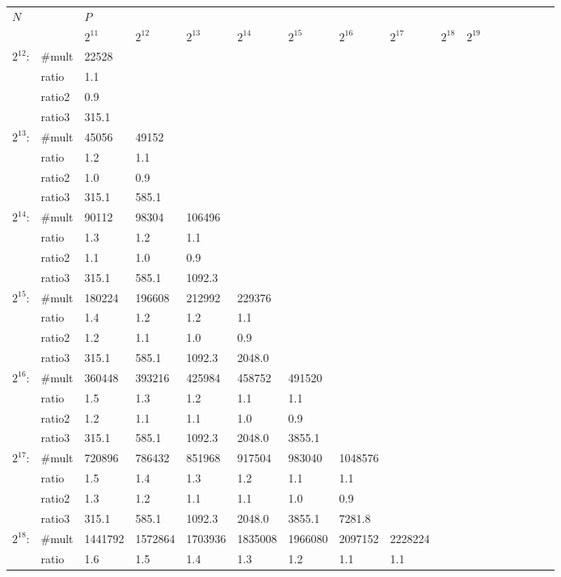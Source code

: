 \documentclass[10pt]{article}
\begin{document}
\begin{table*}
\vspace*{1em}
{\tiny
\begin{tabular}{lllllllllllllllll}
\hline
$N$ & & $P$ \\
     &   &     $2^{11}$ & $2^{12}$  & $2^{13}$ & $2^{14}$ & $2^{15}$ & $2^{16}$ & $2^{17}$ & $2^{18}$ & $2^{19}$  \\
  \hline 
  $2^{12}$: & \#mult &  22528\\
          & ratio & 1.1\\
          & ratio2 & 0.9\\
          & ratio3 & 315.1\\[.3em]
$2^{13}$: & \#mult &  45056&  49152\\
          & ratio & 1.2& 1.1\\
          & ratio2 & 1.0& 0.9\\
          & ratio3 & 315.1& 585.1\\[.3em]
$2^{14}$: & \#mult &  90112&  98304&  106496\\
          & ratio & 1.3& 1.2& 1.1\\
          & ratio2 & 1.1& 1.0& 0.9\\
          & ratio3 & 315.1& 585.1& 1092.3\\[.3em]
$2^{15}$: & \#mult &  180224&  196608&  212992&  229376\\
          & ratio & 1.4& 1.2& 1.2& 1.1\\
          & ratio2 & 1.2& 1.1& 1.0& 0.9\\
          & ratio3 & 315.1& 585.1& 1092.3& 2048.0\\[.3em]
$2^{16}$: & \#mult &  360448&  393216&  425984&  458752&  491520\\
          & ratio & 1.5& 1.3& 1.2& 1.1& 1.1\\
          & ratio2 & 1.2& 1.1& 1.1& 1.0& 0.9\\
          & ratio3 & 315.1& 585.1& 1092.3& 2048.0& 3855.1\\[.3em]
$2^{17}$: & \#mult &  720896&  786432&  851968&  917504&  983040&  1048576\\
          & ratio & 1.5& 1.4& 1.3& 1.2& 1.1& 1.1\\
          & ratio2 & 1.3& 1.2& 1.1& 1.1& 1.0& 0.9\\
          & ratio3 & 315.1& 585.1& 1092.3& 2048.0& 3855.1& 7281.8\\[.3em]
$2^{18}$: & \#mult &  1441792&  1572864&  1703936&  1835008&  1966080&  2097152&  2228224\\
          & ratio & 1.6& 1.5& 1.4& 1.3& 1.2& 1.1& 1.1\\

\end{tabular}}
\end{table*}
\end{document}
